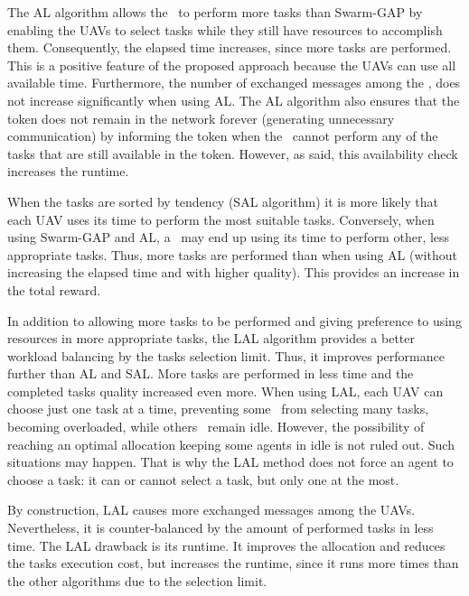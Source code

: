 The AL algorithm allows the \uavs\ to perform more tasks than Swarm-GAP by enabling the UAVs to select tasks while they still have resources to accomplish them.
Consequently, the elapsed time increases, since more tasks are performed. This is a positive feature of the proposed approach because the UAVs can use all available time. 
Furthermore, the number of exchanged messages among the \uavs, does not increase significantly when using AL. 
The AL algorithm also ensures that the token does not remain in the network forever (generating unnecessary communication) by informing the token when the \uav\ cannot perform any of the tasks that are still available in the token. However, as said, this availability check increases the runtime. 

When the tasks are sorted by tendency (SAL algorithm) it is more likely that each UAV uses its time to perform the most suitable tasks. Conversely, when using Swarm-GAP and AL, a \uav\ may end up using its time to perform other, less appropriate tasks. Thus, more tasks are performed than when using AL (without increasing the elapsed time and with higher quality). This provides an increase in the total reward.

In addition to allowing more tasks to be performed and giving preference to using resources in more appropriate tasks, the LAL algorithm provides a better workload balancing by the tasks selection limit. Thus, it improves performance further than AL and SAL. More tasks are performed in less time and the completed tasks quality increased even more. When using LAL, each UAV can choose just one task at a time, preventing some \uavs\ from selecting many tasks, becoming overloaded, while others \uavs\ remain idle.
However, the possibility of reaching an optimal allocation keeping some agents in idle is not ruled out. Such situations may happen. That is why the LAL method does not force an agent to choose a task: it can or cannot select a task, but only one at the most.

By construction, LAL causes more exchanged messages among the UAVs. Nevertheless, it is counter-balanced by the amount of performed tasks in less time. The LAL drawback is its runtime. It improves the allocation and reduces the tasks execution cost, but increases the runtime, since it runs more times than the other algorithms due to the selection limit. 
